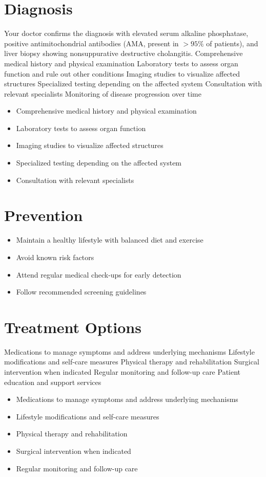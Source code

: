 \section{Diagnosis}
Your doctor confirms the diagnosis with elevated serum alkaline phosphatase, positive antimitochondrial antibodies (AMA, present in $>95\%$ of patients), and liver biopsy showing nonsuppurative destructive cholangitis. Comprehensive medical history and physical examination Laboratory tests to assess organ function and rule out other conditions Imaging studies to visualize affected structures Specialized testing depending on the affected system Consultation with relevant specialists Monitoring of disease progression over time

\begin{itemize}[noitemsep]
  \item Comprehensive medical history and physical examination
  \item Laboratory tests to assess organ function
  \item Imaging studies to visualize affected structures
  \item Specialized testing depending on the affected system
  \item Consultation with relevant specialists
\end{itemize}
\section{Prevention}
\begin{itemize}[noitemsep]
  \item Maintain a healthy lifestyle with balanced diet and exercise
  \item Avoid known risk factors
  \item Attend regular medical check-ups for early detection
  \item Follow recommended screening guidelines
\end{itemize}
\section{Treatment Options}
Medications to manage symptoms and address underlying mechanisms Lifestyle modifications and self-care measures Physical therapy and rehabilitation Surgical intervention when indicated Regular monitoring and follow-up care Patient education and support services

\begin{itemize}[noitemsep]
  \item Medications to manage symptoms and address underlying mechanisms
  \item Lifestyle modifications and self-care measures
  \item Physical therapy and rehabilitation
  \item Surgical intervention when indicated
  \item Regular monitoring and follow-up care
\end{itemize}
